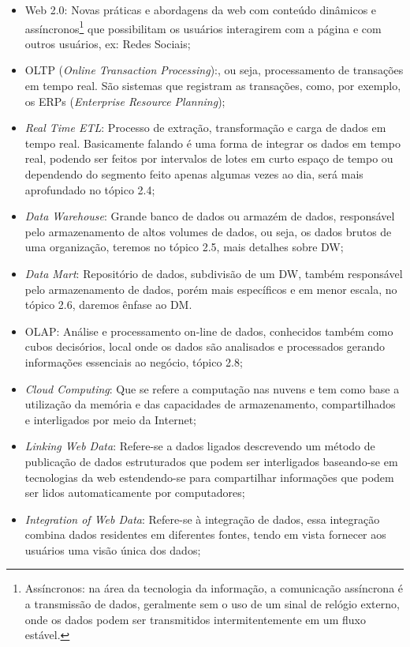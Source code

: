 \begin{itemize}
    \item Web 2.0: Novas pr\'{a}ticas e abordagens da web com conteúdo dinâmicos e assíncronos\footnote{Assíncronos: na \'{a}rea da tecnologia da informa\c{c}\~{a}o, a comunica\c{c}\~{a}o assíncrona \'{e} a transmiss\~{a}o de dados, geralmente sem o uso de um sinal de relógio externo, onde os dados podem ser transmitidos intermitentemente em um fluxo est\'{a}vel.} que possibilitam os usu\'{a}rios interagirem com a p\'{a}gina e com outros usu\'{a}rios, ex: Redes Sociais;
    \item OLTP (\textit{Online Transaction Processing}):, ou seja, processamento de transa\c{c}ões em tempo real. S\~{a}o sistemas que registram as transa\c{c}ões, como, por exemplo, os ERPs (\textit{Enterprise Resource Planning});
    \item \textit{Real Time ETL}: Processo de extra\c{c}\~{a}o, transforma\c{c}\~{a}o e carga de dados em tempo real. Basicamente falando \'{e} uma forma de integrar os dados em tempo real, podendo ser feitos por intervalos de lotes em curto espa\c{c}o de tempo ou dependendo do segmento feito apenas algumas vezes ao dia, ser\'{a} mais aprofundado no tópico 2.4;
    \item \textit{Data Warehouse}: Grande banco de dados ou armaz\'{e}m de dados, respons\'{a}vel pelo armazenamento de altos volumes de dados, ou seja, os dados brutos de uma organiza\c{c}\~{a}o, teremos no tópico 2.5, mais detalhes sobre DW; 
    \item \textit{Data Mart}: Repositório de dados, subdivis\~{a}o de um DW, tamb\'{e}m respons\'{a}vel pelo armazenamento de dados, por\'{e}m mais específicos e em menor escala, no tópico 2.6, daremos ênfase ao DM.
    \item OLAP: An\'{a}lise e processamento on-line de dados, conhecidos tamb\'{e}m como cubos decisórios, local onde os dados s\~{a}o analisados e processados gerando informa\c{c}ões essenciais ao negócio, tópico 2.8; 
    \item \textit{Cloud Computing}: Que se refere a computa\c{c}\~{a}o nas nuvens e tem como base a utiliza\c{c}\~{a}o da memória e das capacidades de armazenamento, compartilhados e interligados por meio da Internet;
    \item \textit{Linking Web Data}: Refere-se a dados ligados descrevendo um m\'{e}todo de publica\c{c}\~{a}o de dados estruturados que podem ser interligados baseando-se em tecnologias da web estendendo-se para compartilhar informa\c{c}ões que podem ser lidos automaticamente por computadores; 
    \item \textit{Integration of Web Data}: Refere-se \`{a} integra\c{c}\~{a}o de dados, essa integra\c{c}\~{a}o combina dados residentes em diferentes fontes, tendo em vista fornecer aos usu\'{a}rios uma vis\~{a}o única dos dados;

\end{itemize}
